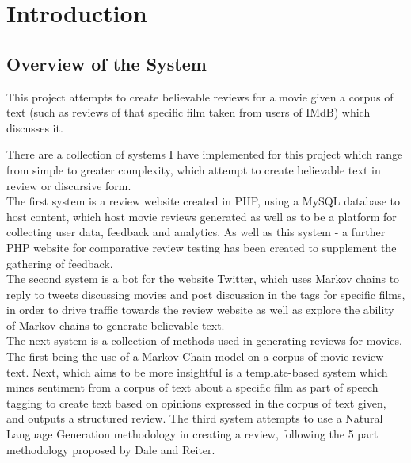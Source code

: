 %

\chapter{\label{ch:1-intro}Introduction} 

\minitoc

\section{Overview of the System}
This project attempts to create believable reviews for a movie given a corpus of text (such as reviews of that specific film taken from users of IMdB) which discusses it. 

There are a collection of systems I have implemented for this project which range from simple to greater complexity, which attempt to create believable text in review or discursive form. \\

The first system is a review website created in PHP, using a MySQL database to host content, which host movie reviews generated as well as to be a platform for collecting user data, feedback and analytics. As well as this system - a further PHP website for comparative review testing has been created to supplement the gathering of feedback.\\

The second system is a bot for the website Twitter, which uses Markov chains to reply to tweets discussing movies and post discussion in the tags for specific films, in order to drive traffic towards the review website as well as explore the ability of Markov chains to generate believable text.\\

The next system is a collection of methods used in generating reviews for movies. The first being the use of a Markov Chain model on a corpus of movie review text. Next, which aims to be more insightful is a template-based system which mines sentiment from a corpus of text about a specific film as part of speech tagging to create text based on opinions expressed in the corpus of text given, and outputs a structured review. The third system attempts to use a Natural Language Generation methodology in creating a review, following the 5 part methodology proposed by Dale and Reiter.

